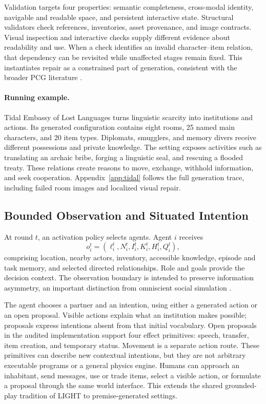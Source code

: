 Validation targets four properties: semantic completeness, cross-modal
identity, navigable and readable space, and persistent interactive state.
Structural validators check references, inventories, asset provenance, and
image contracts. Visual inspection and interactive checks supply different
evidence about readability and use. When a check identifies an invalid
character--item relation, that dependency can be revisited while unaffected
stages remain fixed. This instantiates repair as a constrained part of
generation, consistent with the broader PCG literature \cite{pcgml}.

\paragraph{Running example.}
Tidal Embassy of Lost Languages turns linguistic scarcity into institutions
and actions. Its generated configuration contains eight rooms, 25 named main
characters, and 20 item types. Diplomats, smugglers, and memory divers receive
different possessions and private knowledge. The setting exposes activities
such as translating an archaic bribe, forging a linguistic seal, and rescuing
a flooded treaty. These relations create reasons to move, exchange, withhold
information, and seek cooperation. Appendix~\ref{app:tidal} follows the full
generation trace, including failed room images and localized visual repair.

\subsection{Bounded Observation and Situated Intention}
At round $t$, an activation policy selects agents. Agent $i$ receives
\begin{equation}
o_i^t=(\ell_i^t,N_i^t,I_i^t,K_i^t,H_i^t,Q_i^t),
\end{equation}
comprising location, nearby actors, inventory, accessible knowledge, episode
and task memory, and selected directed relationships. Role and goals provide
the decision context. The observation boundary is intended to preserve
information asymmetry, an important distinction from omniscient social
simulation \cite{misleading}.

The agent chooses a partner and an intention, using either a generated action
or an open proposal. Visible actions explain what an institution makes
possible; proposals express intentions absent from that initial vocabulary.
Open proposals in the audited implementation support four effect primitives:
speech, transfer, item creation, and temporary status. Movement is a separate
action route. These primitives can describe new contextual intentions, but
they are not arbitrary executable programs or a general physics engine. Humans can approach an inhabitant, send messages, use or trade
items, select a visible action, or formulate a proposal through the same world
interface. This extends the shared grounded-play tradition of LIGHT
\cite{light} to premise-generated settings.

